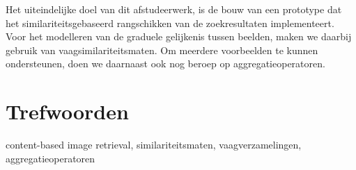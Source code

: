 Het uiteindelijke doel van dit afstudeerwerk, is de bouw van een prototype dat
het similariteitsgebaseerd rangschikken van de zoekresultaten implementeert.
Voor het modelleren van de graduele gelijkenis tussen beelden, maken we daarbij gebruik van 
vaagsimilariteitsmaten. Om meerdere voorbeelden te kunnen ondersteunen, doen we 
daarnaast ook nog beroep op aggregatieoperatoren.

\section*{Trefwoorden}
content-based image retrieval, similariteitsmaten, vaagverzamelingen, aggregatieoperatoren

